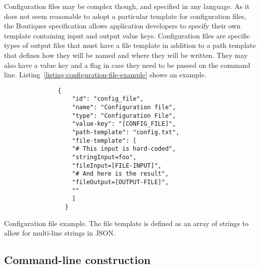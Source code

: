 \documentclass{article}
\newcommand{\boutiques}{Boutiques\xspace}
\begin{document}
Configuration files may be complex though, and specified in any
language.  As it does not seem reasonable to adopt a particular
template for configuration files, the \boutiques specification allows
application developers to specify their own template containing input
and output value keys. Configuration files are specific types of
output files that must have a file template in addition to a path
template that defines how they will be named and where they will be
written. They may also have a value key and a flag in case they need
to be passed on the command
line. Listing~\ref{listing:configuration-file-example} shows an
example.
\begin{listing}
\begin{verbatim}
               {
                   "id": "config_file",
                   "name": "Configuration file",
                   "type": "Configuration File",
                   "value-key": "[CONFIG_FILE]",
                   "path-template": "config.txt",
                   "file-template": [
                   "# This input is hard-coded",
                   "stringInput=foo",
                   "fileInput=[FILE-INPUT]",
                   "# And here is the result",
                   "fileOutput=[OUTPUT-FILE]",
                   ""
                   ]
                 }
\end{verbatim}
\caption{Configuration file example. The file template is defined as
  an array of strings to allow for multi-line strings in JSON.}
\label{listing:configuration-file-example}
\end{listing}

\subsection{Command-line construction}
\end{document}
